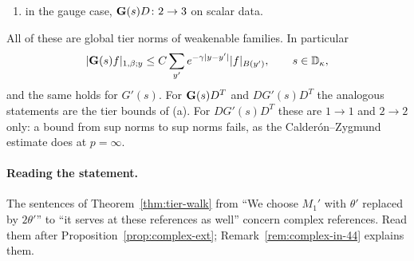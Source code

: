 \begin{theorem}
\begin{enumerate}[label=(\alph*)]
\item in the gauge case, $\mathbf G(s)D\colon2\to3$ on scalar data.
\end{enumerate}
All of these are global tier norms of weakenable families. In particular
\[
|\mathbf G(s)f|_{1,\beta;y}\le C\sum_{y'}e^{-\gamma|y-y'|}|f|_{B(y')},\qquad s\in\mathbb D_\kappa ,
\]
and the same holds for $G'(s)$. For $\mathbf G(s)D^T$ and $DG'(s)D^T$ the analogous statements are the tier bounds of (a). For $DG'(s)D^T$ these are $1\to1$ and $2\to2$ only: a bound from sup norms to sup norms fails, as the Calder\'on--Zygmund estimate does at $p=\infty$.
\end{theorem}

\paragraph{Reading the statement.} The sentences of Theorem~\ref{thm:tier-walk} from ``We choose $M_1'$ with $\theta'$ replaced by $2\theta'$'' to ``it serves at these references as well'' concern complex references. Read them after Proposition~\ref{prop:complex-ext}; Remark~\ref{rem:complex-in-44} explains them.

